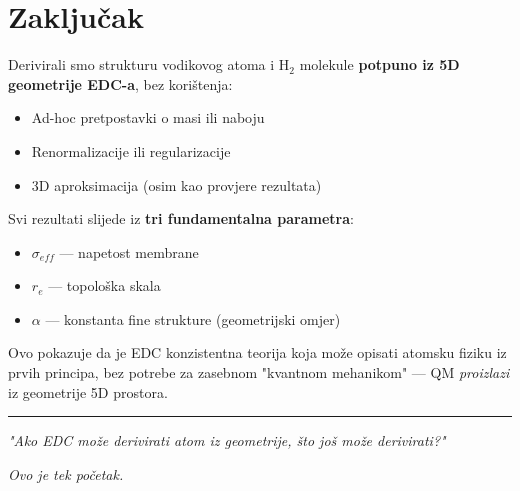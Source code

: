 \documentclass[12pt,a4paper]{article}
\begin{document}
\section{Zaključak}

Derivirali smo strukturu vodikovog atoma i H$_2$ molekule \textbf{potpuno iz 5D geometrije EDC-a}, bez korištenja:
\begin{itemize}
    \item Ad-hoc pretpostavki o masi ili naboju
    \item Renormalizacije ili regularizacije
    \item 3D aproksimacija (osim kao provjere rezultata)
\end{itemize}

Svi rezultati slijede iz \textbf{tri fundamentalna parametra}:
\begin{itemize}
    \item $\sigma_{eff}$ — napetost membrane
    \item $r_e$ — topološka skala
    \item $\alpha$ — konstanta fine strukture (geometrijski omjer)
\end{itemize}

Ovo pokazuje da je EDC konzistentna teorija koja može opisati atomsku fiziku iz prvih principa, bez potrebe za zasebnom "kvantnom mehanikom" — QM \textit{proizlazi} iz geometrije 5D prostora.

\vspace{1cm}
\begin{center}
\rule{0.5\textwidth}{0.4pt}

\textit{"Ako EDC može derivirati atom iz geometrije, što još može derivirati?"}

\textit{Ovo je tek početak.}
\end{center}
\end{document}
